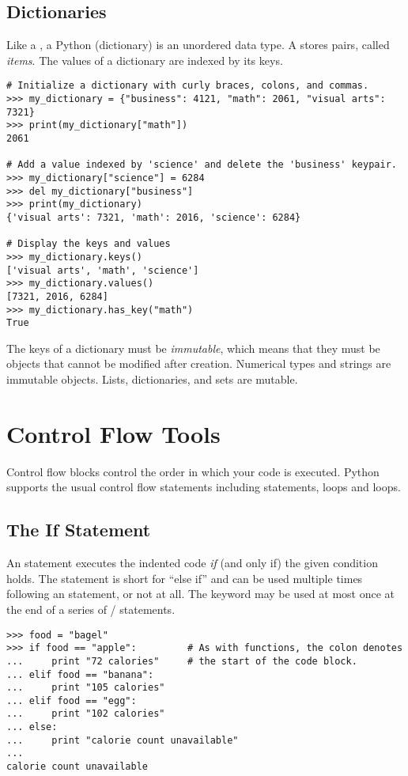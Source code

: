 
\subsection*{Dictionaries}
Like a , a Python  (dictionary) is an unordered data type.
A  stores  pairs, called \emph{items}.
The values of a dictionary are indexed by its keys.
\begin{lstlisting}
# Initialize a dictionary with curly braces, colons, and commas.
>>> my_dictionary = {"business": 4121, "math": 2061, "visual arts": 7321} 
>>> print(my_dictionary["math"])
2061

# Add a value indexed by 'science' and delete the 'business' keypair.
>>> my_dictionary["science"] = 6284
>>> del my_dictionary["business"]
>>> print(my_dictionary)
{'visual arts': 7321, 'math': 2016, 'science': 6284}

# Display the keys and values
>>> my_dictionary.keys()
['visual arts', 'math', 'science']
>>> my_dictionary.values()
[7321, 2016, 6284]
>>> my_dictionary.has_key("math")
True
\end{lstlisting}

The keys of a dictionary must be \emph{immutable}, which means that they must be objects that cannot be modified after creation. Numerical types and strings are immutable objects. Lists, dictionaries, and sets are mutable.


\section*{Control Flow Tools}
Control flow blocks control the order in which your code is executed.
Python supports the usual control flow statements 
including  statements,  loops and  loops. 

\subsection*{The If Statement}
An  statement executes the indented code \emph{if} (and only if) the given condition holds.
The  statement is short for ``else if'' and can be used multiple times following an  statement, or not at all. 
The  keyword may be used at most once at the end of a series of / statements.
\begin{lstlisting}
>>> food = "bagel"         
>>> if food == "apple":         # As with functions, the colon denotes
...     print "72 calories"     # the start of the code block.
... elif food == "banana":
...     print "105 calories"
... elif food == "egg":
...     print "102 calories"
... else: 
...     print "calorie count unavailable"
...     
calorie count unavailable
\end{lstlisting}

